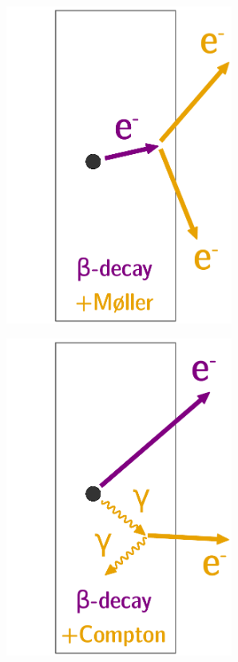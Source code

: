 \begin{figure}[!h]
\begin{subfigure}[t]{0.32\textwidth}
  \includegraphics[width=0.82\textwidth]{SNdemonstrator/fig_SNdemonstrator/internal_contamination_moller.pdf}
  \captionsetup{justification=justified}
  \caption{
    \label{subfig:cont_Pint_ROI}}
\end{subfigure}
\hfill
\begin{subfigure}[t]{0.32\textwidth}
  \centering
  \includegraphics[width=0.82\textwidth]{SNdemonstrator/fig_SNdemonstrator/internal_contamination_compton.pdf}

\end{subfigure}
\end{figure}
